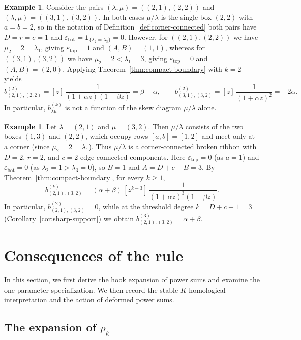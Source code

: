 \documentclass[11pt]{amsart}
\numberwithin{equation}{section}
\theoremstyle{definition}
\newtheorem{example}[theorem]{Example}
\theoremstyle{remark}
\newcommand{\ind}{\mathbf 1}
\begin{document}
\begin{example}\label{prop:not-shape-only}
Consider the pairs $(\lambda,\mu)=((2,1),(2,2))$ and
$(\lambda,\mu)=((3,1),(3,2))$. In both cases $\mu/\lambda$ is the single box
$(2,2)$ with $a=b=2$, so in the notation of
Definition~\ref{def:corner-connected} both pairs have $D=r=c=1$ and
$\varepsilon_{\mathrm{bot}}=\ind_{\{\lambda_2=\lambda_3\}}=0$. However, for
$((2,1),(2,2))$ we have $\mu_2=2=\lambda_1$, giving
$\varepsilon_{\mathrm{top}}=1$ and $(A,B)=(1,1)$, whereas for
$((3,1),(3,2))$ we have $\mu_2=2<\lambda_1=3$, giving
$\varepsilon_{\mathrm{top}}=0$ and $(A,B)=(2,0)$. Applying
Theorem~\ref{thm:compact-boundary} with $k=2$ yields
\[
 b^{(2)}_{(2,1),(2,2)}
 =[z]\,\frac{1}{(1+\alpha z)(1-\beta z)}=\beta-\alpha,
 \qquad
 b^{(2)}_{(3,1),(3,2)}
 =[z]\,\frac{1}{(1+\alpha z)^2}=-2\alpha.
\]
In particular, $b^{(k)}_{\lambda\mu}$ is not a function of the skew diagram
$\mu/\lambda$ alone.
\end{example}

\begin{example}\label{ex:disconnected}
Let $\lambda=(2,1)$ and $\mu=(3,2)$. Then $\mu/\lambda$ consists of the two
boxes $(1,3)$ and $(2,2)$, which occupy rows $[a,b]=[1,2]$ and meet only at
a corner (since $\mu_2=2=\lambda_1$). Thus $\mu/\lambda$ is a
corner-connected broken ribbon with $D=2$, $r=2$, and $c=2$ edge-connected
components. Here $\varepsilon_{\mathrm{top}}=0$ (as $a=1$) and
$\varepsilon_{\mathrm{bot}}=0$ (as $\lambda_2=1>\lambda_3=0$), so $B=1$ and
$A=D+c-B=3$. By Theorem~\ref{thm:compact-boundary}, for every $k\geq1$,
\[
 b^{(k)}_{(2,1),(3,2)}
 =(\alpha+\beta)\,[z^{k-3}]\,\frac{1}{(1+\alpha z)^3(1-\beta z)}.
\]
In particular, $b^{(2)}_{(2,1),(3,2)}=0$, while at the threshold degree
$k=D+c-1=3$ (Corollary~\ref{cor:sharp-support}) we obtain
$b^{(3)}_{(2,1),(3,2)}=\alpha+\beta$.
\end{example}


\section{Consequences of the rule}\label{sec:consequences}
In this section, we first derive the hook expansion of power sums and examine
the one-parameter specialization.
We then record the stable $K$-homological interpretation and
the action of deformed power sums.

\subsection{The expansion of \texorpdfstring{$p_k$}{pk}}\label{sec:hooks}
\end{document}

